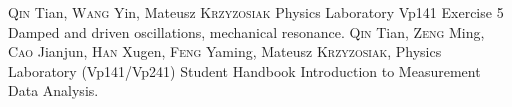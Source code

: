 \begin{thebibliography}{99}
     \textsc{Qin} Tian, \textsc{Wang} Yin, Mateusz \textsc{Krzyzosiak} Physics Laboratory Vp141 Exercise 5 Damped and driven oscillations, mechanical resonance.
     \textsc{Qin} Tian, \textsc{Zeng} Ming, \textsc{Cao} Jianjun, \textsc{Han} Xugen, \textsc{Feng} Yaming, Mateusz \textsc{Krzyzosiak}, Physics Laboratory (Vp141/Vp241) Student Handbook Introduction to Measurement Data Analysis.
\end{thebibliography}